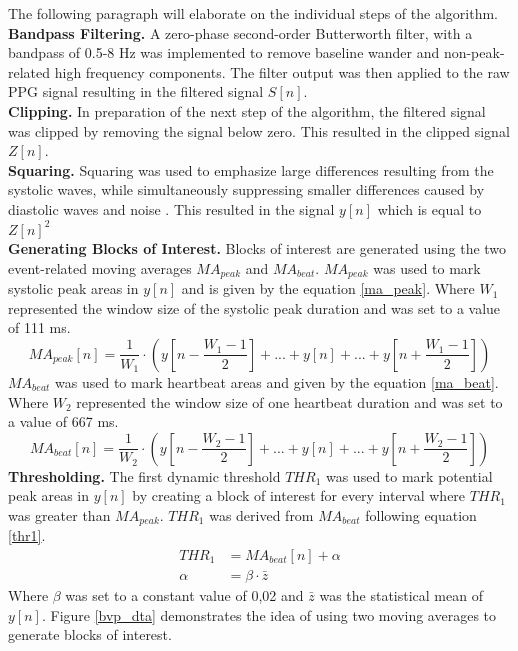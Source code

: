 The following paragraph will elaborate on the individual steps of the algorithm.\\
\textbf{Bandpass Filtering.} A zero-phase second-order Butterworth filter, with a bandpass of 0.5-8 Hz was implemented to remove baseline wander and non-peak-related high frequency components. The filter output was then applied to the raw PPG signal resulting in the filtered signal $S[n]$.\\
\textbf{Clipping.} In preparation of the next step of the algorithm, the filtered signal was clipped by removing the signal below zero. This resulted in the clipped signal $Z[n]$.\\
\textbf{Squaring.} Squaring was used to emphasize large differences resulting from the systolic waves, while simultaneously suppressing smaller differences caused by diastolic waves and noise \cite{Elgendi2013}.
This resulted in the signal $y[n]$ which is equal to $Z[n]^{2}$\\
\textbf{Generating Blocks of Interest.} Blocks of interest are generated using the two event-related moving averages $MA_{peak}$ and $MA_{beat}$. $MA_{peak}$ was used to mark systolic peak areas in $y[n]$ and is given by the equation \ref{ma_peak}. Where $W_{1}$ represented the window size of the systolic peak duration and was set to a value of 111 ms.\\
\begin{equation}\label{ma_peak}
MA_{peak}[n] = \frac{1}{W_{1}}\cdot(y[n-\frac{W_{1}-1}{2}]+...+y[n]+...+y[n+\frac{W_{1}-1}{2}])
\end{equation}
$MA_{beat}$ was used to mark heartbeat areas and given by the equation \ref{ma_beat}. Where $W_{2}$ represented the window size of one heartbeat duration and was set to a value of 667 ms.\\
\begin{equation}\label{ma_beat}
MA_{beat}[n] = \frac{1}{W_{2}}\cdot(y[n-\frac{W_{2}-1}{2}]+...+y[n]+...+y[n+\frac{W_{2}-1}{2}])
\end{equation}
\textbf{Thresholding.} The first dynamic threshold $THR_{1}$ was used to mark potential peak areas in $y[n]$ by creating a block of interest for every interval where $THR_{1}$ was greater than $MA_{peak}$. $THR_{1}$ was derived from $MA_{beat}$ following equation \ref{thr1}.
\begin{align} \label{thr1}
THR_{1} &= MA_{beat}[n]+\alpha \\
\alpha &= \beta\cdot\bar{z}
\end{align}
Where $\beta$ was set to a constant value of 0,02 and $\bar{z}$ was the statistical mean of $y[n]$. Figure \ref{bvp_dta} demonstrates the idea of using two moving averages to generate blocks of interest.

